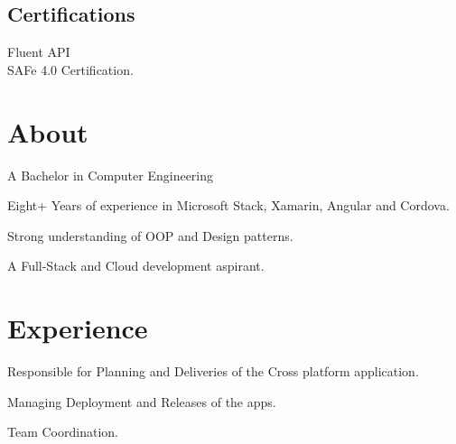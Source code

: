 \documentclass[]{deedy-resume-openfont}
\begin{document}
\begin{minipage}[t]{0.33\textwidth}
\subsection{Certifications}
\vspace{1mm}
\textbullet{} Fluent API \\
\vspace{1mm}
\textbullet{} SAFe 4.0 Certification. \\

%
%

\end{minipage} 
\hfill
\begin{minipage}[t]{0.66\textwidth} 

\section{About}
\vspace{\topsep}
\begin{tightemize}
\item A Bachelor in Computer Engineering
\item Eight+ Years of experience in Microsoft Stack, Xamarin, Angular and Cordova.
\item Strong understanding of OOP and Design patterns.
\item A Full-Stack and Cloud development aspirant.
\end{tightemize}
\sectionsep

\section{Experience}
\begin{tightemize}
\item Responsible for Planning and Deliveries of the Cross platform application.
\item Managing Deployment and Releases of the apps.
\item Team Coordination.
\end{tightemize}
\sectionsep


\end{minipage}
\end{document}
